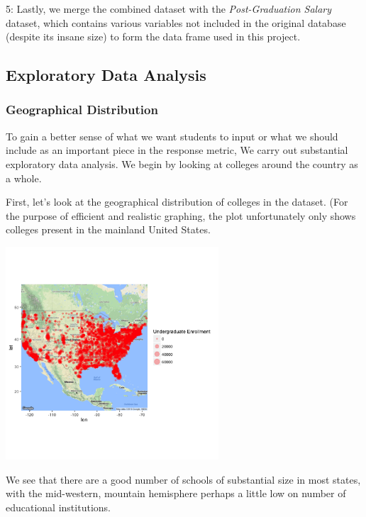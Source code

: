 \documentclass{article}\usepackage[]{graphicx}\usepackage[]{color}
\newenvironment{knitrout}{}{} %
\begin{document}
5: Lastly, we merge the combined dataset with the \emph{Post-Graduation Salary} dataset, which contains various variables not included in the original database (despite its insane size) to form the data frame used in this project. 

\subsection{Exploratory Data Analysis}

\subsubsection{Geographical Distribution}
To gain a better sense of what we want students to input or what we should include as an important piece in the response metric, We carry out substantial exploratory data analysis. We begin by looking at colleges around the country as a whole.

First, let's look at the geographical distribution of colleges in the dataset. (For the purpose of efficient  and realistic graphing, the plot unfortunately only shows colleges present in the mainland United States.

\begin{knitrout}
\color{fgcolor}

{\centering \includegraphics[width=300px]{../images/ggmap-schoolDistribution} 

}



\end{knitrout}

We see that there are a good number of schools of substantial size in most states, with the mid-western, mountain hemisphere perhaps a little low on number of educational institutions.
\end{document}
